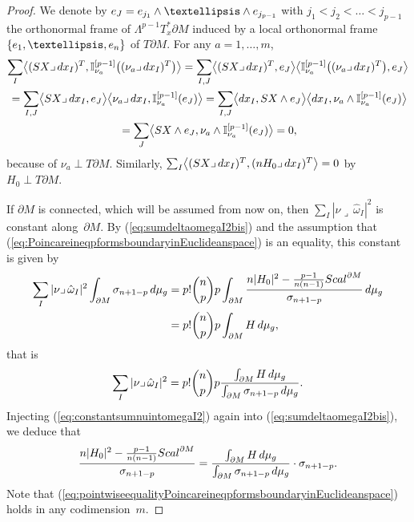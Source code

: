 \documentclass[11pt]{article}
\numberwithin{equation}{section}
\numberwithin{equation}{section}
\begin{document}
\begin{proof}
We denote by ${\rm e}_J={\rm e}_{j_1}\wedge\dots \wedge {\rm e}_{j_{p-1}}$ with $j_1<j_2<\dots<j_{p-1}$ the orthonormal frame of $\Lambda^{p-1}T_x^*\partial M$ induced by a local orthonormal frame $\{{\rm e}_1,\dots,{\rm e}_n\}$ of $T\partial M$.
For any $a=1,\dots,m$,
\begin{gather*}
\sum_I\bigl\langle (SX\lrcorner\,{\rm d}x_I)^T,\mathbb{I}_{\nu_a}^{[p-1]}\bigl((\nu_a\lrcorner\,{\rm d}x_I)^T\bigr)\bigr\rangle=\sum_{I,J}\bigl\langle (SX\lrcorner\,{\rm d}x_I)^T,{\rm e}_J\bigr\rangle \bigl\langle \mathbb{I}_{\nu_a}^{[p-1]}\bigl((\nu_a\lrcorner\,{\rm d}x_I)^T\bigr),{\rm e}_J\bigr\rangle\\
\hphantom{}=\sum_{I,J}\bigl\langle SX\lrcorner\,{\rm d}x_I,{\rm e}_J\bigr\rangle \bigl\langle \nu_a\lrcorner\,{\rm d}x_I,\mathbb{I}_{\nu_a}^{[p-1]}({\rm e}_J)\bigr\rangle
=\sum_{I,J}\bigl\langle {\rm d}x_I,SX\wedge {\rm e}_J\bigr\rangle \bigl\langle {\rm d}x_I,\nu_a\wedge \mathbb{I}_{\nu_a}^{[p-1]}({\rm e}_J)\bigr\rangle\\
\hphantom{}=\sum_{J}\bigl\langle SX\wedge {\rm e}_J,\nu_a\wedge \mathbb{I}_{\nu_a}^{[p-1]}({\rm e}_J)\bigr\rangle
=0,
\end{gather*}
because of $\nu_a\perp T\partial M$.
Similarly, $\sum_I\bigl\langle (SX\lrcorner\,{\rm d}x_I)^T,(nH_0\lrcorner\,{\rm d}x_I)^T\bigr\rangle=0$ by $H_0\perp T\partial M$.


If $\partial M$ is connected, which will be assumed from now on, then $\sum_I|\nu\lrcorner\,\hat{\omega}_I|^2$ is constant along~$\partial M$. By (\ref{eq:sumdeltaomegaI2bis}) and the assumption that (\ref{eq:PoincareineqpformsboundaryinEuclideanspace}) is an equality, this constant is given by
\begin{align*}
\sum_I|\nu\lrcorner\,\hat{\omega}_I|^2\int_{\partial M}\sigma_{n+1-p}\,{\rm d}\mu_g&= p!\binom{n}{p}p\int_{\partial M}\frac{n|H_0|^2-\frac{p-1}{n(n-1)}{\rm Scal}^{\partial M}}{\sigma_{n+1-p}}\,{\rm d}\mu_g\\
&= p!\binom{n}{p}p\int_{\partial M}H\,{\rm d}\mu_g,
\end{align*}
that is
\begin{equation}\label{eq:constantsumnuintomegaI2}
\sum_I|\nu\lrcorner\,\hat{\omega}_I|^2=p!\binom{n}{p}p\frac{\int_{\partial M}H\,{\rm d}\mu_g}{\int_{\partial M}\sigma_{n+1-p}\,{\rm d}\mu_g}.
\end{equation}
Injecting (\ref{eq:constantsumnuintomegaI2}) again  into (\ref{eq:sumdeltaomegaI2bis}), we deduce that
\begin{equation}\label{eq:pointwiseequalityPoincareineqpformsboundaryinEuclideanspace}
\frac{n|H_0|^2-\frac{p-1}{n(n-1)}{\rm Scal}^{\partial M}}{\sigma_{n+1-p}}=\frac{\int_{\partial M}H\,{\rm d}\mu_g}{\int_{\partial M}\sigma_{n+1-p}\,{\rm d}\mu_g}\cdot\sigma_{n+1-p}.
\end{equation}
Note that (\ref{eq:pointwiseequalityPoincareineqpformsboundaryinEuclideanspace}) holds in any codimension~$m$.


\end{proof}
\end{document}
